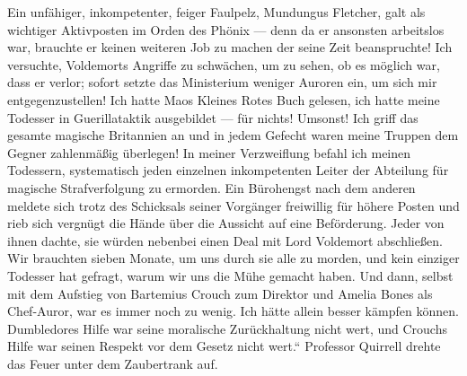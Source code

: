 Ein unfähiger, inkompetenter, feiger Faulpelz, Mundungus Fletcher, galt als wichtiger Aktivposten im Orden des Phönix — denn da er ansonsten arbeitslos war, brauchte er keinen weiteren Job zu machen der seine Zeit beanspruchte! Ich versuchte, Voldemorts Angriffe zu schwächen, um zu sehen, ob es möglich war, dass er verlor; sofort setzte das Ministerium weniger Auroren ein, um sich mir entgegenzustellen! Ich hatte Maos Kleines Rotes Buch gelesen, ich hatte meine Todesser in Guerillataktik ausgebildet — für nichts! Umsonst! Ich griff das gesamte magische Britannien an und in jedem Gefecht waren meine Truppen dem Gegner zahlenmäßig überlegen! In meiner Verzweiflung befahl ich meinen Todessern, systematisch jeden einzelnen inkompetenten Leiter der Abteilung für magische Strafverfolgung zu ermorden. Ein Bürohengst nach dem anderen meldete sich trotz des Schicksals seiner Vorgänger freiwillig für höhere Posten und rieb sich vergnügt die Hände über die Aussicht auf eine Beförderung. Jeder von ihnen dachte, sie würden nebenbei einen Deal mit Lord Voldemort abschließen. Wir brauchten sieben Monate, um uns durch sie alle zu morden, und kein einziger Todesser hat gefragt, warum wir uns die Mühe gemacht haben. Und dann, selbst mit dem Aufstieg von Bartemius Crouch zum Direktor und Amelia Bones als Chef-Auror, war es immer noch zu wenig. Ich hätte allein besser kämpfen können. Dumbledores Hilfe war seine moralische Zurückhaltung nicht wert, und Crouchs Hilfe war seinen Respekt vor dem Gesetz nicht wert.“
Professor Quirrell drehte das Feuer unter dem Zaubertrank auf.


